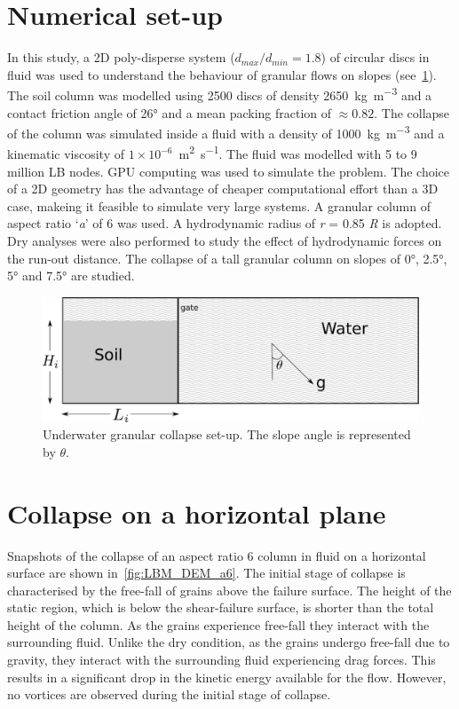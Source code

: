 \documentclass[epj,twocolumn]{webofc}
\begin{document}
\section{Numerical set-up}
In this study, a 2D poly-disperse system ($d_{max} / d_{min} = 1.8$) of
circular discs in fluid was used to understand the behaviour of granular
flows on slopes (see~\cref{fig:geometry}).
The soil column was modelled using 2500 discs of density
2650~\si{\kilogram\per\meter\cubed} and a contact friction angle of
26\si{\degree} and a mean packing fraction of $\approx 0.82$.
The  collapse of the column was simulated inside a fluid
with a density of 1000~\si{\kilogram\per\meter\cubed} and a kinematic viscosity
of $1 \times 10^{-6}$~\si{\meter\squared\per\second}. The fluid was modelled
with 5 to 9 million LB nodes. GPU computing was used to simulate the problem.
The choice of a 2D geometry has the advantage of cheaper computational
effort than a 3D case, makeing it feasible to simulate very large systems.
A granular column of aspect ratio `\textit{a}' of 6 was used. A hydrodynamic
radius of \textit{r} = 0.85 \textit{R} is adopted. Dry analyses were also
performed to study the effect of hydrodynamic forces on the run-out distance.
The collapse of a tall granular column on slopes of 0\si{\degree},
2.5\si{\degree}, 5\si{\degree} and 7.5\si{\degree} are studied.

\begin{figure}
  \centering
  \includegraphics[width=0.95\linewidth]{figs/geometry}
  \caption{Underwater granular collapse set-up.
    The slope angle is represented by $\theta$.}
  \label{fig:geometry}
\end{figure}

\section{Collapse on a horizontal plane}
Snapshots of the collapse of an aspect ratio 6 column in fluid on a horizontal 
surface are shown in~\cref{fig:LBM_DEM_a6}. The initial stage of collapse is 
characterised by the free-fall of grains above the failure surface.
The height of the static region, which is below the shear-failure surface,
is shorter than the total height of the column. As the grains experience
free-fall they interact with the surrounding fluid. Unlike the dry condition,
as the grains undergo free-fall due to gravity, they interact 
with the surrounding fluid experiencing drag forces. This results in a 
significant drop in the kinetic energy available for the flow.
However, no vortices are observed during the initial stage of collapse.
\end{document}
